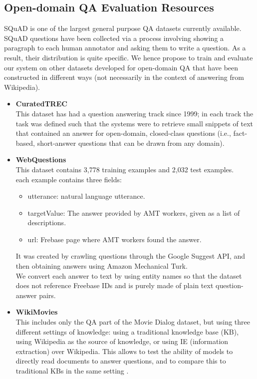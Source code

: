   \subsection{Open-domain QA Evaluation Resources}
  SQuAD is one of the largest general purpose QA datasets currently available. SQuAD questions have been collected via a process involving showing a paragraph to each human annotator and asking them to write a question. As a result, their distribution is quite specific. We hence propose to train and evaluate our system on other datasets developed for open-domain QA that have been constructed in different ways (not necessarily in the context of answering from Wikipedia).
  \begin{itemize}
      \item \textbf{CuratedTREC} \label{CuratedTREC}\\
        This dataset has had a question answering track since 1999; in each track the task was defined such that the systems were to retrieve small snippets of text that contained an answer for open-domain, closed-class questions (i.e., fact-based, short-answer questions that can be drawn from any domain). 
      \item \textbf{WebQuestions} \label{WebQuestions}\\ 
      This dataset contains 3,778 training examples and 2,032 test examples. \\ 
      each example contains three fields:
      \begin{itemize}
          \item utterance: natural language utterance.
          \item targetValue: The answer provided by AMT workers, given as a list of descriptions.
          \item url: Frebase page where AMT workers found the answer.\cite{web035}\@
      \end{itemize}
      It was created by crawling questions through the Google Suggest API, and then obtaining answers using Amazon Mechanical Turk.\\ We convert each answer to text by using entity names so that the dataset does not reference Freebase IDs and is purely made of plain text question-answer pairs.
      \item \textbf{WikiMovies} \label{wikiMovies}\\
      This includes only the QA part of the Movie Dialog dataset, but using three different settings of knowledge: using a traditional knowledge base (KB), using Wikipedia as the source of knowledge, or using IE (information extraction) over Wikipedia. This allows to test the ability of models to directly read documents to answer questions, and to compare this to traditional KBs in the same setting \cite{web034}\@.
  \end{itemize}
  
